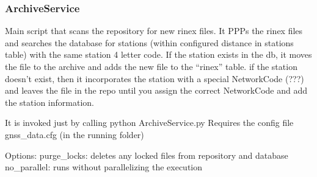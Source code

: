 \documentclass[letterpaper,10pt,english]{sphinxmanual}
\begin{document}
\subsubsection{ArchiveService}
\label{\detokenize{com:archiveservice}}
\sphinxAtStartPar
Main script that scans the repository for new rinex files.
It PPPs the rinex files and searches the database for stations (within configured distance in stations table)
with the same station 4 letter code.
If the station exists in the db, it moves the file to the archive and adds the new file to the “rinex” table.
if the station doesn’t exist, then it incorporates the station with a special NetworkCode (???) and leaves the
file in the repo until you assign the correct NetworkCode and add the station information.

\sphinxAtStartPar
It is invoked just by calling python ArchiveService.py
Requires the config file gnss\_data.cfg (in the running folder)

\sphinxAtStartPar
Options:
\textendash{}purge\_locks: deletes any locked files from repository and database
\textendash{}no\_parallel: runs without parallelizing the execution

\begin{fulllineitems}
\label{\detokenize{com:com.ArchiveService.callback_handle}}
\pysigstartsignatures
{}
\pysigstopsignatures
\end{fulllineitems}


\begin{fulllineitems}
\label{\detokenize{com:com.ArchiveService.check_rinex_timespan_int}}
\pysigstartsignatures
{}
\pysigstopsignatures
\end{fulllineitems}

\end{document}
